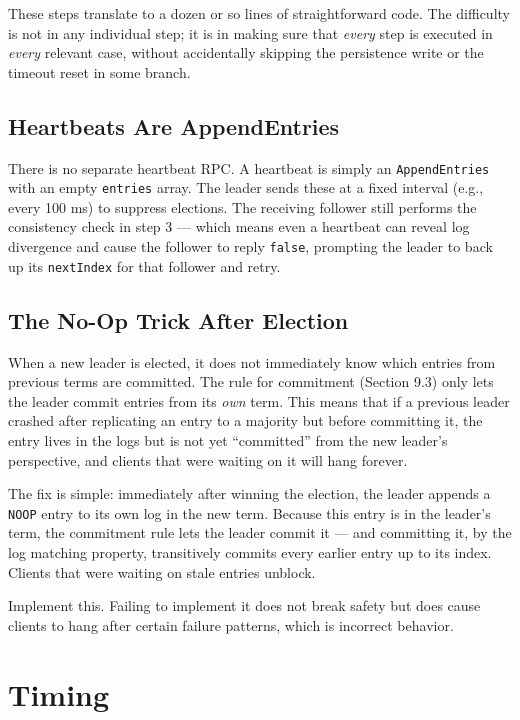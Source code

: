 \documentclass[11pt,a4paper]{article}
\begin{document}
These steps translate to a dozen or so lines of straightforward code. The difficulty is not in any individual step; it is in making sure that \textit{every} step is executed in \textit{every} relevant case, without accidentally skipping the persistence write or the timeout reset in some branch.

\subsection{Heartbeats Are AppendEntries}
There is no separate heartbeat RPC. A heartbeat is simply an \texttt{AppendEntries} with an empty \texttt{entries} array. The leader sends these at a fixed interval (e.g., every 100 ms) to suppress elections. The receiving follower still performs the consistency check in step 3 --- which means even a heartbeat can reveal log divergence and cause the follower to reply \texttt{false}, prompting the leader to back up its \texttt{nextIndex} for that follower and retry.

\subsection{The No-Op Trick After Election}
When a new leader is elected, it does not immediately know which entries from previous terms are committed. The rule for commitment (Section 9.3) only lets the leader commit entries from its \textit{own} term. This means that if a previous leader crashed after replicating an entry to a majority but before committing it, the entry lives in the logs but is not yet ``committed'' from the new leader's perspective, and clients that were waiting on it will hang forever.

The fix is simple: immediately after winning the election, the leader appends a \texttt{NOOP} entry to its own log in the new term. Because this entry is in the leader's term, the commitment rule lets the leader commit it --- and committing it, by the log matching property, transitively commits every earlier entry up to its index. Clients that were waiting on stale entries unblock.

Implement this. Failing to implement it does not break safety but does cause clients to hang after certain failure patterns, which is incorrect behavior.

\section{Timing}
\end{document}
